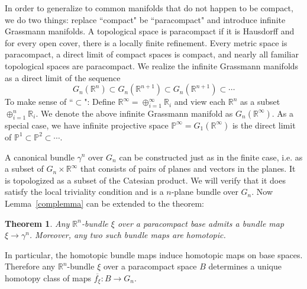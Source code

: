 \documentclass[12pt]{article}
\theoremstyle{plain}
\newtheorem{theorem}[equation]{Theorem}
\theoremstyle{definition}
\newcommand{\IP}{\mathbb{P}}
\newcommand{\IR}{\mathbb{R}}
\newcommand{\<}{\langle}
\renewcommand{\>}{\rangle}
\newcommand{\wb}{\overline}
\begin{document}
In order to generalize to common manifolds that do not happen to be compact, we do two things: replace ``compact" be ``paracompact" and introduce infinite Grassmann manifolds. A topological space is paracompact if it is Hausdorff and for every open cover, there is a locally finite refinement. Every metric space is paracompact, a direct limit of compact spaces is compact, and nearly all familiar topological spaces are paracompact. We realize the infinite Grassmann manifolds as a direct limit of the sequence 
$$ G_n(\IR^n) \subset G_n(\IR^{n+1}) \subset G_n(\IR^{n + 1}) \subset \cdots $$
To make sense of ``$\subset$": Define $\IR^\infty = \oplus_{i = 1}^\infty \IR_i$ and view each $\IR^n$ as a subset $\oplus_{i = 1}^n \IR_i$. We denote the above infinite Grassmann manifold as $G_n(\IR^\infty)$. As a special case, we have infinite projective space $\IP^\infty = G_1(\IR^\infty)$ is the direct limit of $\IP^1 \subset \IP^2 \subset \cdots$. 

A canonical bundle $\gamma^n$ over $G_n$ can be constructed just as in the finite case, i.e. as a subset of $G_n \times \IR^\infty$ that consists of pairs of planes and vectors in the planes. It is topologized as a subset of the Catesian product. We will verify that it does satisfy the local triviality condition and is a $n$-plane bundle over $G_n$. Now Lemma~\ref{complemma} can be extended to the theorem:
\begin{theorem}
Any $\IR^n$-bundle $\xi$ over a paracompact base admits a bundle map $\xi \to \gamma^n$. Moreover, any two such bundle maps are homotopic. 
\end{theorem}
In particular, the homotopic bundle maps induce homotopic maps on base spaces. Therefore any $\IR^n$-bundle $\xi$ over a paracompact space $B$ determines a unique homotopy class of maps $\wb{f_\xi} : B \to G_n$. 
\end{document}
